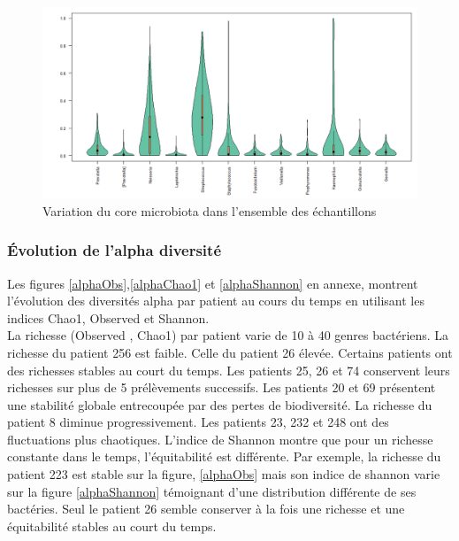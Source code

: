\documentclass[12pt,a4paper]{article}
\begin{document}
\begin{figure}[t]
\begin{center}
\includegraphics[scale=0.5]{img/variability.png}\hfill
\end{center}
\caption{Variation du core microbiota dans l'ensemble des échantillons}
\label{violon}
\end{figure}

\subsubsection{Évolution de l'alpha diversité}
Les figures \ref{alphaObs},\ref{alphaChao1} et \ref{alphaShannon} en annexe, montrent l’évolution des diversités alpha par patient au cours du temps en utilisant les indices Chao1, Observed et Shannon. \\
La richesse (Observed , Chao1) par patient varie de 10 à 40 genres bactériens. La richesse du patient 256 est faible. Celle du patient 26 élevée.
Certains patients ont des richesses stables au court du temps. Les patients 25, 26 et 74 conservent leurs richesses sur plus de 5 prélèvements successifs. Les patients 20 et 69 présentent une stabilité globale entrecoupée par des pertes de biodiversité. La richesse du patient 8 diminue progressivement. Les patients 23, 232 et 248 ont des fluctuations plus chaotiques.
L'indice de Shannon montre que pour un richesse constante dans le temps, l'équitabilité est différente. Par exemple, la richesse du patient 223 est stable sur la figure, \ref{alphaObs} mais son indice de shannon varie sur la figure \ref{alphaShannon} témoignant d'une distribution différente de ses bactéries. Seul le patient 26 semble conserver à la fois une richesse et une équitabilité stables au court du temps.
\end{document}
